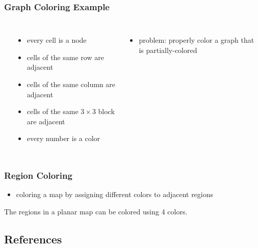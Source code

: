 \documentclass[dvipsnames]{beamer}
\begin{document}
\begin{frame}
  \frametitle{Graph Coloring Example}

  \begin{example}[Sudoku]
    \begin{columns}[t]
      \begin{center}
      \end{center}

      \begin{itemize}
        \item every cell is a node
        \item cells of the same row are adjacent
        \item cells of the same column are adjacent
        \item cells of the same $3 \times 3$ block are adjacent
        \item every number is a color
      \end{itemize}

      \pause
      \begin{itemize}
        \item problem: properly color a graph that is partially-colored
      \end{itemize}
    \end{columns}
  \end{example}
\end{frame}

\begin{frame}
  \frametitle{Region Coloring}

  \begin{itemize}
    \item coloring a map by assigning different colors to adjacent regions
  \end{itemize}

  \pause
  \medskip
  \begin{theorem}
    The regions in a planar map can be colored using 4 colors.
  \end{theorem}
\end{frame}

\subsection*{References}
\end{document}

